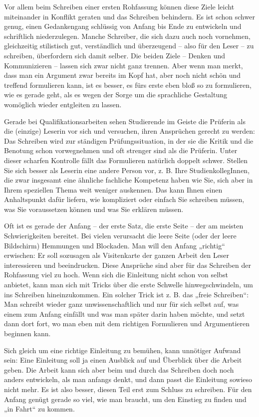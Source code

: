 \documentclass[]{book}
\theoremstyle{definition}
\theoremstyle{definition}
\theoremstyle{definition}
\theoremstyle{remark}
\begin{document}
Vor allem beim Schreiben einer ersten Rohfassung können diese Ziele
leicht miteinander in Konflikt geraten und das Schreiben behindern. Es
ist schon schwer genug, einen Gedankengang schlüssig von Anfang bis Ende
zu entwickeln und schriftlich niederzulegen. Manche Schreiber, die sich
dazu auch noch vornehmen, gleichzeitig stilistisch gut, verständlich und
überzeugend -- also für den Leser -- zu schreiben, überfordern sich
damit selber. Die beiden Ziele -- Denken und Kommunizieren -- lassen
sich zwar nicht ganz trennen. Aber wenn man merkt, dass man ein Argument
zwar bereits im Kopf hat, aber noch nicht schön und treffend formulieren
kann, ist es besser, es fürs erste eben bloß so zu formulieren, wie es
gerade geht, als es wegen der Sorge um die sprachliche Gestaltung
womöglich wieder entgleiten zu lassen.

Gerade bei Qualifikationsarbeiten sehen Studierende im Geiste die
Prüferin als die (einzige) Leserin vor sich und versuchen, ihren
Ansprüchen gerecht zu werden: Das Schreiben wird zur ständigen
Prüfungssituation, in der sie die Kritik und die Benotung schon
vorwegnehmen und oft strenger sind als die Prüferin. Unter dieser
scharfen Kontrolle fällt das Formulieren natürlich doppelt schwer.
Stellen Sie sich besser als Leserin eine andere Person vor, z. B. Ihre
StudienkollegInnen, die zwar insgesamt eine ähnliche fachliche Kompetenz
haben wie Sie, sich aber in Ihrem speziellen Thema weit weniger
auskennen. Das kann Ihnen einen Anhaltspunkt dafür liefern, wie
kompliziert oder einfach Sie schreiben müssen, was Sie voraussetzen
können und was Sie erklären müssen.

Oft ist es gerade der Anfang -- der erste Satz, die erste Seite -- der
am meisten Schwierigkeiten bereitet. Bei vielen verursacht die leere
Seite (oder der leere Bildschirm) Hemmungen und Blockaden. Man will den
Anfang „richtig`` erwischen: Er soll sozusagen als Visitenkarte der
ganzen Arbeit den Leser interessieren und beeindrucken. Diese Ansprüche
sind aber für das Schreiben der Rohfassung viel zu hoch. Wenn sich die
Einleitung nicht schon von selbst anbietet, kann man sich mit Tricks
über die erste Schwelle hinwegschwindeln, um ins Schreiben
hineinzukommen. Ein solcher Trick ist z. B. das „freie Schreiben``: Man
schreibt wieder ganz unwissenschaftlich und nur für sich selbst auf, was
einem zum Anfang einfällt und was man später darin haben möchte, und
setzt dann dort fort, wo man eben mit dem richtigen Formulieren und
Argumentieren beginnen kann.

Sich gleich um eine richtige Einleitung zu bemühen, kann unnötiger
Aufwand sein: Eine Einleitung soll ja einen Ausblick auf und Überblick
über die Arbeit geben. Die Arbeit kann sich aber beim und durch das
Schreiben doch noch anders entwickeln, als man anfangs denkt, und dann
passt die Einleitung sowieso nicht mehr. Es ist also besser, diesen Teil
erst zum Schluss zu schreiben. Für den Anfang genügt gerade so viel, wie
man braucht, um den Einstieg zu finden und „in Fahrt`` zu kommen.
\end{document}
